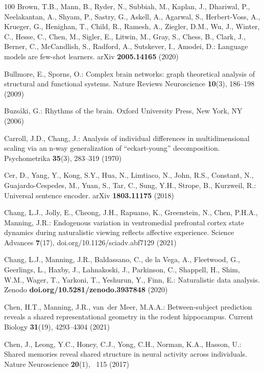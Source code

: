 \documentclass{llmxive}
\begin{document}
\begin{thebibliography}{100}
Brown, T.B., Mann, B., Ryder, N., Subbiah, M., Kaplan, J., Dhariwal, P.,
  Neelakantan, A., Shyam, P., Sastry, G., Askell, A., Agarwal, S.,
  Herbert-Voss, A., Krueger, G., Henighan, T., Child, R., Ramesh, A., Ziegler,
  D.M., Wu, J., Winter, C., Hesse, C., Chen, M., Sigler, E., Litwin, M., Gray,
  S., Chess, B., Clark, J., Berner, C., McCandlish, S., Radford, A., Sutskever,
  I., Amodei, D.: Language models are few-shot learners. {arXiv}
  \textbf{2005.14165} (2020)

Bullmore, E., Sporns, O.: Complex brain networks: graph theoretical analysis of
  structural and functional systems. Nature Reviews Neuroscience
  \textbf{10}(3),  186--198 (2009)

Buzs\'{a}ki, G.: Rhythms of the brain. {Oxford} {University} Press, New York,
  {NY} (2006)

Carroll, J.D., Chang, J.: Analysis of individual differences in
  multidimensional scaling via an n-way generalization of ``eckart-young''
  decomposition. Psychometrika  \textbf{35}(3),  283--319 (1970)

Cer, D., Yang, Y., Kong, S.Y., Hua, N., Limtiaco, N., John, R.S., Constant, N.,
  Guajardo-Cespedes, M., Yuan, S., Tar, C., Sung, Y.H., Strope, B., Kurzweil,
  R.: Universal sentence encoder. {arXiv}  \textbf{1803.11175} (2018)

Chang, L.J., Jolly, E., Cheong, J.H., Rapuano, K., Greenstein, N., Chen,
  P.H.A., Manning, J.R.: Endogenous variation in ventromedial prefrontal cortex
  state dynamics during naturalistic viewing reflects affective experience.
  Science Advances  \textbf{7}(17),  doi.org/10.1126/sciadv.abf7129 (2021)

Chang, L.J., Manning, J.R., Baldassano, C., {de la Vega}, A., Fleetwood, G.,
  Geerlings, L., Haxby, J., Lahnakoski, J., Parkinson, C., Shappell, H., Shim,
  W.M., Wager, T., Yarkoni, T., Yeshurun, Y., Finn, E.: Naturalistic data
  analysis. Zenodo  \textbf{doi.org/10.5281/zenodo.3937848} (2020)

Chen, H.T., Manning, J.R., van~der Meer, M.A.A.: Between-subject prediction
  reveals a shared representational geometry in the rodent hippocampus. Current
  Biology  \textbf{31}(19),  4293--4304 (2021)

Chen, J., Leong, Y.C., Honey, C.J., Yong, C.H., Norman, K.A., Hasson, U.:
  Shared memories reveal shared structure in neural activity across
  individuals. Nature Neuroscience  \textbf{20}(1), ~115 (2017)


\end{thebibliography}
\end{document}
